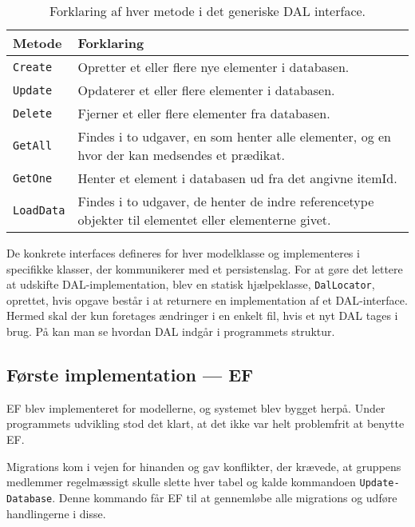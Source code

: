\begin{table}[h]
    \begin{tabular}{p{2cm}|p{13cm}}
    \textbf{Metode}   & \textbf{Forklaring}       \\ \hline
    \texttt{Create}   & Opretter et eller flere nye elementer i databasen.                                           \\ \hline
    \texttt{Update}   & Opdaterer et eller flere elementer i databasen.                                              \\ \hline
    \texttt{Delete}   & Fjerner et eller flere elementer fra databasen.                                              \\ \hline
    \texttt{GetAll}   & Findes i to udgaver, en som henter alle elementer, og en hvor der kan medsendes et prædikat. \\ \hline
    \texttt{GetOne}   & Henter et element i databasen ud fra det angivne itemId.                                    \\ \hline
    \texttt{LoadData} & Findes i to udgaver, de henter de indre referencetype objekter til elementet eller elementerne givet. \\ \hline
    \end{tabular}
    \caption{Forklaring af hver metode i det generiske DAL interface.}
    \label{tab:ourExtCrud}
\end{table}

De konkrete interfaces defineres for hver modelklasse og implementeres i specifikke klasser, der kommunikerer med et persistenslag.
For at gøre det lettere at udskifte \ac{DAL}-implementation, blev en statisk hjælpeklasse, \texttt{DalLocator}, oprettet, hvis opgave består i at returnere en implementation af et \ac{DAL}-interface. Hermed skal der kun foretages ændringer i en enkelt fil, hvis et nyt DAL tages i brug.
På  kan man se hvordan \ac{DAL} indgår i programmets struktur.

\subsection{Første implementation --- \acl{EF}}\label{subsec:Pwoblem}

\acl{EF} blev implementeret for modellerne, og systemet blev bygget herpå.
Under programmets udvikling stod det klart, at det ikke var helt problemfrit at benytte \ac{EF}.

Migrations kom i vejen for hinanden og gav konflikter, der krævede, at gruppens medlemmer regelmæssigt skulle slette hver tabel og kalde kommandoen \texttt{Update-Database}.
Denne kommando får \ac{EF} til at gennemløbe alle migrations og udføre handlingerne i disse.

